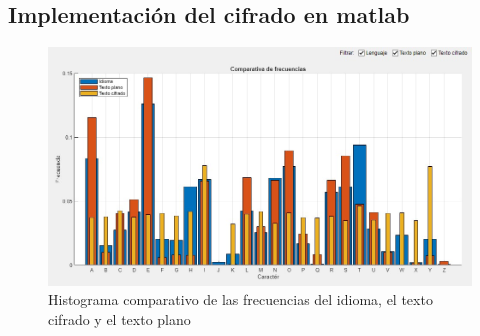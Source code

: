 \documentclass[10pt]{article}
\begin{document}
\newpage


\subsection{Implementación del cifrado en matlab}      

\newpage

\begin{figure}[!ht]
  \centering
  \includegraphics[width=1\textwidth]{hillHistogram.jpg}
  \caption{Histograma comparativo de las frecuencias del idioma, el texto cifrado y el texto plano}
  \label{fig_sim}
\end{figure}
\end{document}
